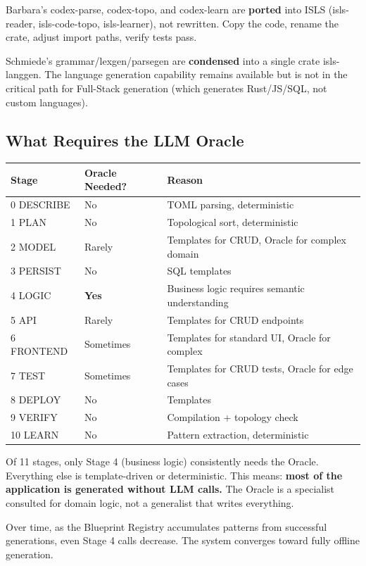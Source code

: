 \documentclass[11pt,a4paper]{article}
\begin{document}
Barbara's codex-parse, codex-topo, and codex-learn are \textbf{ported}
into ISLS (isls-reader, isls-code-topo, isls-learner), not rewritten.
Copy the code, rename the crate, adjust import paths, verify tests pass.

Schmiede's grammar/lexgen/parsegen are \textbf{condensed} into a single
crate isls-langgen. The language generation capability remains
available but is not in the critical path for Full-Stack generation
(which generates Rust/JS/SQL, not custom languages).

\subsection{What Requires the LLM Oracle}

\begin{center}
\small
\begin{tabular}{lll}
\toprule
\textbf{Stage} & \textbf{Oracle Needed?} & \textbf{Reason} \\
\midrule
0 DESCRIBE & No & TOML parsing, deterministic \\
1 PLAN & No & Topological sort, deterministic \\
2 MODEL & Rarely & Templates for CRUD, Oracle for complex domain \\
3 PERSIST & No & SQL templates \\
4 LOGIC & \textbf{Yes} & Business logic requires semantic understanding \\
5 API & Rarely & Templates for CRUD endpoints \\
6 FRONTEND & Sometimes & Templates for standard UI, Oracle for complex \\
7 TEST & Sometimes & Templates for CRUD tests, Oracle for edge cases \\
8 DEPLOY & No & Templates \\
9 VERIFY & No & Compilation + topology check \\
10 LEARN & No & Pattern extraction, deterministic \\
\bottomrule
\end{tabular}
\end{center}

Of 11 stages, only Stage 4 (business logic) consistently needs the
Oracle. Everything else is template-driven or deterministic.
This means: \textbf{most of the application is generated without LLM
calls.} The Oracle is a specialist consulted for domain logic, not
a generalist that writes everything.

Over time, as the Blueprint Registry accumulates patterns from
successful generations, even Stage 4 calls decrease. The system
converges toward fully offline generation.
\end{document}
